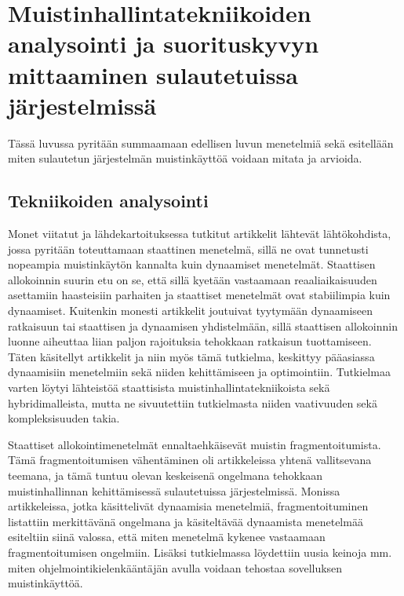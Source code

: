 \chapter{Muistinhallintatekniikoiden analysointi ja suorituskyvyn mittaaminen sulautetuissa järjestelmissä} \label{Kuudes luku}

Tässä luvussa pyritään summaamaan edellisen luvun menetelmiä sekä esitellään miten sulautetun järjestelmän muistinkäyttöä voidaan mitata ja arvioida.

\section{Tekniikoiden analysointi}

Monet viitatut ja lähdekartoituksessa tutkitut artikkelit lähtevät lähtökohdista, jossa pyritään toteuttamaan staattinen menetelmä, sillä ne ovat tunnetusti nopeampia muistinkäytön kannalta kuin dynaamiset menetelmät\cite{daroemmfera@2006}\cite{soeosmm@2009}. Staattisen allokoinnin suurin etu on se, että sillä kyetään vastaamaan reaaliaikaisuuden asettamiin haasteisiin parhaiten ja staattiset menetelmät ovat stabiilimpia kuin dynaamiset\cite{daroemmfera@2006}. Kuitenkin monesti artikkelit joutuivat tyytymään dynaamiseen ratkaisuun tai staattisen ja dynaamisen yhdistelmään, sillä staattisen allokoinnin luonne aiheuttaa liian paljon rajoituksia tehokkaan ratkaisun tuottamiseen\cite{daroemmfera@2006}\cite{soeosmm@2009}. Täten käsitellyt artikkelit ja niin myös tämä tutkielma, keskittyy pääasiassa dynaamisiin menetelmiin sekä niiden kehittämiseen ja optimointiin. Tutkielmaa varten löytyi lähteistöä staattisista muistinhallintatekniikoista sekä hybridimalleista, mutta ne sivuutettiin tutkielmasta niiden vaativuuden sekä kompleksisuuden takia.

Staattiset allokointimenetelmät ennaltaehkäisevät muistin fragmentoitumista\cite{daroemmfera@2006}. Tämä fragmentoitumisen vähentäminen oli artikkeleissa yhtenä vallitsevana teemana, ja tämä tuntuu olevan keskeisenä ongelmana tehokkaan muistinhallinnan kehittämisessä sulautetuissa järjestelmissä. Monissa artikkeleissa, jotka käsittelivät dynaamisia menetelmiä, fragmentoituminen listattiin merkittävänä ongelmana ja käsiteltävää dynaamista menetelmää esiteltiin siinä valossa, että miten menetelmä kykenee vastaamaan fragmentoitumisen ongelmiin.\cite{daroemmfera@2006}\cite{ammsfmes@2016}\cite{b@2020} Lisäksi tutkielmassa löydettiin uusia keinoja mm. miten ohjelmointikielenkääntäjän avulla voidaan tehostaa sovelluksen muistinkäyttöä.

